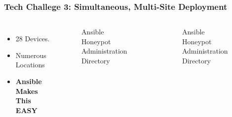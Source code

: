 \begin{frame}
\frametitle{Tech Challege 3: Simultaneous, Multi-Site Deployment}

\begin{columns}
\begin{itemize}
    \item 28 Devices.
    \item Numerous Locations
    \item{\textbf{Ansible Makes This EASY}}
\end{itemize}

\begin{figure}[b]
\caption{Ansible Honeypot Administration Directory}
\end{figure}

\begin{figure}[H]
\caption{Ansible Honeypot Administration Directory}
\end{figure}

\end{columns}

\end{frame}
